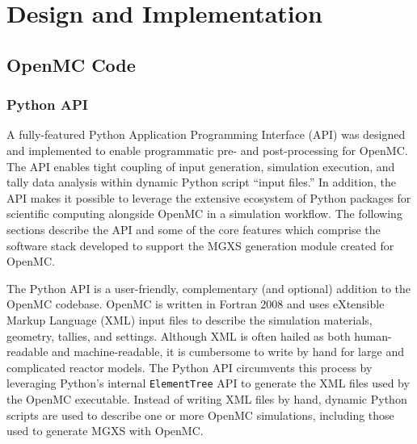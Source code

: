 \section{Design and Implementation}
\label{sec:design}


\subsection{OpenMC Code}
\label{subsec:openmc-overview}


\subsubsection{Python API}
\label{subsec:pyapi}

A fully-featured Python Application Programming Interface (API) was designed and implemented to enable programmatic pre- and post-processing for OpenMC\cite{boyd2016bigdata}. The API enables tight coupling of input generation, simulation execution, and tally data analysis within dynamic Python script ``input files.'' In addition, the API makes it possible to leverage the extensive ecosystem of Python packages for scientific computing alongside OpenMC in a simulation workflow. The following sections describe the API and some of the core features which comprise the software stack developed to support the MGXS generation module created for OpenMC.


The Python API is a user-friendly, complementary (and optional) addition to the OpenMC codebase. OpenMC is written in Fortran 2008 and uses eXtensible Markup Language (XML) input files to describe the simulation materials, geometry, tallies, and settings. Although XML is often hailed as both human-readable and machine-readable, it is cumbersome to write by hand for large and complicated reactor models. The Python API circumvents this process by leveraging Python's internal \texttt{ElementTree} API to generate the XML files used by the OpenMC executable. Instead of writing XML files by hand, dynamic Python scripts are used to describe one or more OpenMC simulations, including those used to generate MGXS with OpenMC.

